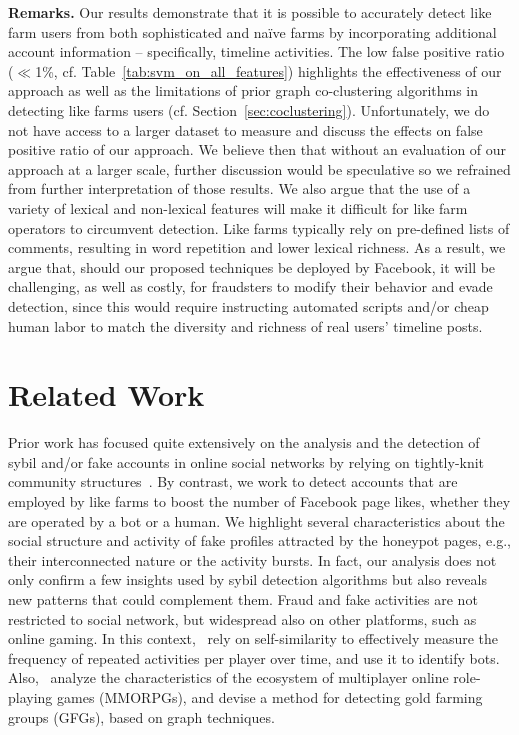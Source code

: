 \documentclass[twocolumn,10pt,letterpaper]{article}
\newcommand{\descr}[1]{\smallskip\noindent\textbf{#1}}
\begin{document}
\descr{Remarks.}
Our results demonstrate that it is possible to accurately detect like farm users from both sophisticated and na\"ive farms by incorporating additional account information -- specifically, timeline activities. 
%
The low false positive ratio ($\ll$1\%, cf. Table~\ref{tab:svm_on_all_features}) highlights the effectiveness of our approach as well as the limitations of prior graph co-clustering algorithms in detecting like farms users (cf. Section~\ref{sec:coclustering}). Unfortunately, we do not have access to a larger dataset to measure and discuss the effects on false positive ratio of our approach. We believe then that without an evaluation of our approach at a larger scale, further discussion would be speculative so we refrained from further interpretation of those results.
%
We also argue that the use of a variety of lexical and non-lexical features will make it difficult for like farm operators to circumvent detection. Like farms typically rely on pre-defined lists of comments, resulting in word repetition and lower lexical richness. As a result, we argue that, should our proposed techniques be deployed by Facebook, it will be challenging, as well as costly, for fraudsters to modify their behavior and evade detection, since this would require instructing automated scripts and/or cheap human labor to match the diversity and richness of real users' timeline posts.

%


\section{Related Work}
\label{sec:related}
%
%
%
%
%
%
%
%
%
%
Prior work has focused quite extensively on the analysis and the detection of sybil and/or fake accounts in online social networks by relying on tightly-knit community structures~\cite{yu06sybilguard,danezis09SybilInfer,yang11socialnetworksybils,cao12fakeosn,yang12spammersocialnetwork,boshmaf15integro}. %
%
 By contrast, we work to detect accounts that are employed by like farms to boost the number of Facebook page likes, whether they are operated by a bot or a human. We highlight several characteristics about the social structure and activity of fake profiles attracted by the honeypot pages, e.g., their interconnected nature or the activity bursts. In fact, our analysis does not only confirm a few insights used by sybil detection algorithms but also reveals new patterns that could complement them.
%
Fraud and fake activities are not restricted to social network, but widespread also on other platforms, such as online gaming. In this context,~\cite{lee2016you}
rely on self-similarity to effectively measure
the frequency of repeated activities per player over time, and use it to identify bots.
Also,~\cite{kwon2017crime}  analyze the characteristics of the ecosystem of multiplayer online role-playing games (MMORPGs), and devise a method for detecting gold farming groups (GFGs), based on graph techniques. 
\end{document}
